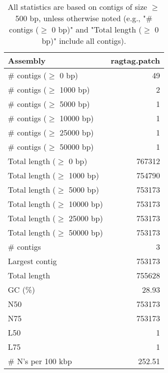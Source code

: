 \documentclass[12pt,a4paper]{article}
\begin{document}
\begin{table}[ht]
\begin{center}
\caption{All statistics are based on contigs of size $\geq$ 500 bp, unless otherwise noted (e.g., "\# contigs ($\geq$ 0 bp)" and "Total length ($\geq$ 0 bp)" include all contigs).}
\begin{tabular}{|l*{1}{|r}|}
\hline
Assembly & ragtag.patch \\ \hline
\# contigs ($\geq$ 0 bp) & 49 \\ \hline
\# contigs ($\geq$ 1000 bp) & 2 \\ \hline
\# contigs ($\geq$ 5000 bp) & 1 \\ \hline
\# contigs ($\geq$ 10000 bp) & 1 \\ \hline
\# contigs ($\geq$ 25000 bp) & 1 \\ \hline
\# contigs ($\geq$ 50000 bp) & 1 \\ \hline
Total length ($\geq$ 0 bp) & 767312 \\ \hline
Total length ($\geq$ 1000 bp) & 754790 \\ \hline
Total length ($\geq$ 5000 bp) & 753173 \\ \hline
Total length ($\geq$ 10000 bp) & 753173 \\ \hline
Total length ($\geq$ 25000 bp) & 753173 \\ \hline
Total length ($\geq$ 50000 bp) & 753173 \\ \hline
\# contigs & 3 \\ \hline
Largest contig & 753173 \\ \hline
Total length & 755628 \\ \hline
GC (\%) & 28.93 \\ \hline
N50 & 753173 \\ \hline
N75 & 753173 \\ \hline
L50 & 1 \\ \hline
L75 & 1 \\ \hline
\# N's per 100 kbp & 252.51 \\ \hline
\end{tabular}
\end{center}
\end{table}
\end{document}
